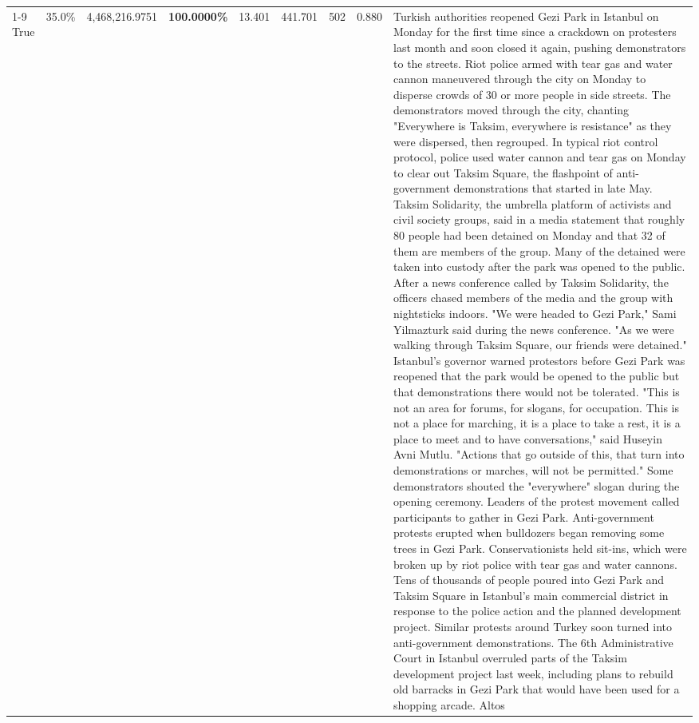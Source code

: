 \begin{table}[H]
\begin{tabular}{lllrlllll}
\cline{1-9}
True & 35.0\% & 4,468,216.9751 & \bfseries \color{red} 100.0000\% & 13.401 & 441.701 & 502 & 0.880 & Turkish authorities reopened Gezi Park in Istanbul on Monday for the first time since a crackdown on protesters last month and soon closed it again, pushing demonstrators to the streets. Riot police armed with tear gas and water cannon maneuvered through the city on Monday to disperse crowds of 30 or more people in side streets. The demonstrators moved through the city, chanting "Everywhere is Taksim, everywhere is resistance" as they were dispersed, then regrouped. In typical riot control protocol, police used water cannon and tear gas on Monday to clear out Taksim Square, the flashpoint of anti-government demonstrations that started in late May. Taksim Solidarity, the umbrella platform of activists and civil society groups, said in a media statement that roughly 80 people had been detained on Monday and that 32 of them are members of the group. Many of the detained were taken into custody after the park was opened to the public. After a news conference called by Taksim Solidarity, the officers chased members of the media and the group with nightsticks indoors. "We were headed to Gezi Park," Sami Yilmazturk said during the news conference. "As we were walking through Taksim Square, our friends were detained." Istanbul's governor warned protestors before Gezi Park was reopened that the park would be opened to the public but that demonstrations there would not be tolerated. "This is not an area for forums, for slogans, for occupation. This is not a place for marching, it is a place to take a rest, it is a place to meet and to have conversations," said Huseyin Avni Mutlu. "Actions that go outside of this, that turn into demonstrations or marches, will not be permitted." Some demonstrators shouted the "everywhere" slogan during the opening ceremony. Leaders of the protest movement called participants to gather in Gezi Park. Anti-government protests erupted when bulldozers began removing some trees in Gezi Park. Conservationists held sit-ins, which were broken up by riot police with tear gas and water cannons. Tens of thousands of people poured into Gezi Park and Taksim Square in Istanbul's main commercial district in response to the police action and the planned development project. Similar protests around Turkey soon turned into anti-government demonstrations. The 6th Administrative Court in Istanbul overruled parts of the Taksim development project last week, including plans to rebuild old barracks in Gezi Park that would have been used for a shopping arcade. Altos \\

\end{tabular}
\end{table}
